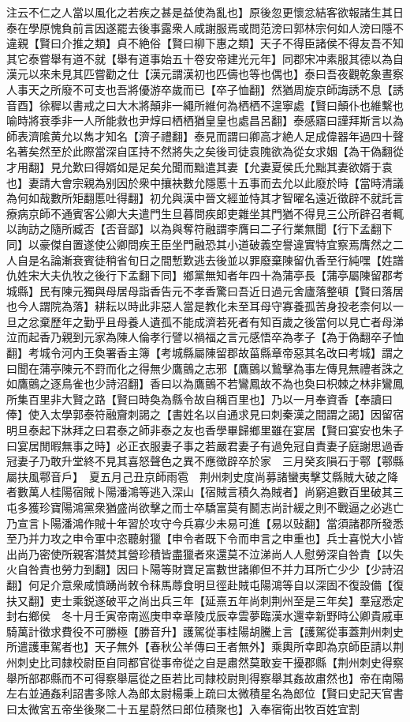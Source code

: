 注云不仁之人當以風化之若疾之甚是益使為亂也】原後忽更懷忿結客欲報諸生其日泰在學原愧負前言因遂罷去後事露衆人咸謝服焉或問范滂曰郭林宗何如人滂曰隱不違親【賢曰介推之類】貞不絶俗【賢曰柳下惠之類】天子不得臣諸侯不得友吾不知其它泰嘗舉有道不就【舉有道事始五十卷安帝建光元年】同郡宋冲素服其德以為自漢元以來未見其匹嘗勸之仕【漢元謂漢初也匹儔也等也偶也】泰曰吾夜觀乾象晝察人事天之所廢不可支也吾將優游卒歲而已【卒子恤翻】然猶周旋京師誨誘不息【誘音酉】徐穉以書戒之曰大木將顛非一繩所維何為栖栖不遑寧處【賢曰顛仆也維繫也喻時將衰季非一人所能救也尹焞曰栖栖猶皇皇也處昌呂翻】泰感寤曰謹拜斯言以為師表濟隂黄允以雋才知名【濟子禮翻】泰見而謂曰卿高才絶人足成偉器年過四十聲名著矣然至於此際當深自匡持不然將失之矣後司徒袁隗欲為從女求姻【為干偽翻從才用翻】見允歎曰得婿如是足矣允聞而黜遣其妻【允妻夏侯氏允黜其妻欲婿于袁也】妻請大會宗親為别因於衆中攘袂數允隱慝十五事而去允以此廢於時【當時清議為何如哉數所矩翻慝吐得翻】初允與漢中晉文經並恃其才智曜名遠近徵辟不就託言療病京師不通賓客公卿大夫遣門生旦暮問疾郎吏雜坐其門猶不得見三公所辟召者輒以詢訪之隨所臧否【否音鄙】以為與奪符融謂李膺曰二子行業無聞【行下孟翻下同】以豪傑自置遂使公卿問疾王臣坐門融恐其小道破義空譽違實特宜察焉膺然之二人自是名論漸衰賓徒稍省旬日之間慙歎逃去後並以罪廢棄陳留仇香至行純嘿【姓譜仇姓宋大夫仇牧之後行下孟翻下同】鄉黨無知者年四十為蒲亭長【蒲亭屬陳留郡考城縣】民有陳元獨與母居母詣香告元不孝香驚曰吾近日過元舍廬落整頓【賢曰落居也今人謂院為落】耕耘以時此非惡人當是教化未至耳母守寡養孤苦身投老柰何以一旦之忿棄歷年之勤乎且母養人遺孤不能成濟若死者有知百歲之後當何以見亡者母涕泣而起香乃親到元家為陳人倫孝行譬以禍福之言元感悟卒為孝子【為于偽翻卒子恤翻】考城令河内王奐署香主簿【考城縣屬陳留郡故菑縣章帝惡其名改曰考城】謂之曰聞在蒲亭陳元不罸而化之得無少鷹鸇之志邪【鷹鸇以鷙擊為事左傳見無禮者誅之如鷹鸇之逐鳥雀也少詩沼翻】香曰以為鷹鸇不若鸞鳳故不為也奐曰枳棘之林非鸞鳳所集百里非大賢之路【賢曰時奐為縣令故自稱百里也】乃以一月奉資香【奉讀曰俸】使入太學郭泰符融齎刺謁之【書姓名以自通求見曰刺秦漢之間謂之謁】因留宿明旦泰起下牀拜之曰君泰之師非泰之友也香學畢歸鄉里雖在宴居【賢曰宴安也朱子曰宴居閒暇無事之時】必正衣服妻子事之若嚴君妻子有過免冠自責妻子庭謝思過香冠妻子乃敢升堂終不見其喜怒聲色之異不應徵辟卒於家　三月癸亥隕石于鄠【鄠縣屬扶風鄠音戶】　夏五月己丑京師雨雹　荆州刺史度尚募諸蠻夷擊艾縣賊大破之降者數萬人桂陽宿賊卜陽潘鴻等逃入深山【宿賊言積久為賊者】尚窮追數百里破其三屯多獲珍寶陽鴻黨衆猶盛尚欲擊之而士卒驕富莫有鬭志尚計緩之則不戰逼之必逃亡乃宣言卜陽潘鴻作賊十年習於攻守今兵寡少未易可進【易以䜴翻】當須諸郡所發悉至乃并力攻之申令軍中恣聽射獵【申令者既下令而申言之申重也】兵士喜悦大小皆出尚乃密使所親客潛焚其營珍積皆盡獵者來還莫不泣涕尚人人慰勞深自咎責【以失火自咎責也勞力到翻】因曰卜陽等財寶足富數世諸卿但不并力耳所亡少少【少詩沼翻】何足介意衆咸憤踴尚敇令秣馬蓐食明旦徑赴賊屯陽鴻等自以深固不復設備【復扶又翻】吏士乘鋭遂破平之尚出兵三年【延熹五年尚刺荆州至是三年矣】羣寇悉定封右鄉侯　冬十月壬寅帝南巡庚申幸章陵戊辰幸雲夢臨漢水還幸新野時公卿貴戚車騎萬計徵求費役不可勝極【勝音升】護駕從事桂陽胡騰上言【護駕從事蓋荆州刺史所遣護車駕者也】天子無外【春秋公羊傳曰王者無外】乘輿所幸即為京師臣請以荆州刺史比司隸校尉臣自同都官從事帝從之自是肅然莫敢妄干擾郡縣【荆州刺史得察舉所部郡縣而不可得察舉扈從之臣若比司隸校尉則得察舉其姦故肅然也】帝在南陽左右並通姦利詔書多除人為郎太尉楊秉上疏曰太微積星名為郎位【賢曰史記天官書曰太微宮五帝坐後聚二十五星蔚然曰郎位積聚也】入奉宿衛出牧百姓宜割